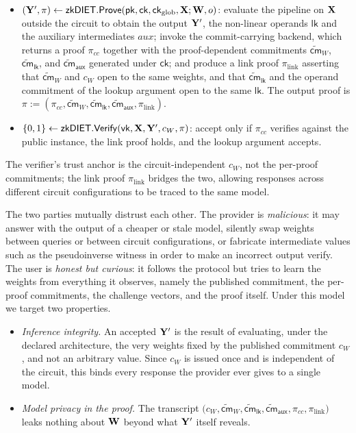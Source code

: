 \documentclass[runningheads]{llncs}
\begin{document}
\begin{itemize} [leftmargin=3mm, itemsep=2pt, topsep=2pt]
  \item $({\mathbf{Y}}', \pi) \leftarrow \mathsf{zkDIET}.\mathsf{Prove} (\mathsf{pk}, \mathsf{ck}, \mathsf{ck}_{\mathrm{glob}}, {\mathbf{X}}; {\mathbf{W}}, o)$:
        evaluate the pipeline on ${\mathbf{X}}$ outside the circuit to obtain the output ${\mathbf{Y}}'$, the non-linear operands $\mathsf{lk}$ and the auxiliary intermediates $\textit{aux}$; invoke the commit-carrying backend, which returns a proof $\pi_{cc}$ together with the proof-dependent commitments $\widetilde{\mathsf{cm}}_{W}$, $\widetilde{\mathsf{cm}}_{\mathsf{lk}}$, and $\widetilde{\mathsf{cm}}_{\mathsf{aux}}$ generated under $\mathsf{ck}$; and produce a link proof $\pi_{\mathrm{link}}$ asserting that $\widetilde{\mathsf{cm}}_{W}$ and $c_{W}$ open to the
        same weights, and that $\widetilde{\mathsf{cm}}_{\mathsf{lk}}$ and the operand commitment of the lookup argument open to the same $\mathsf{lk}$. The output
        proof is $\pi := (\pi_{cc}, \widetilde{\mathsf{cm}}_{W}, \widetilde{\mathsf{cm}}_{\mathsf{lk}}, \widetilde{\mathsf{cm}}_{\mathsf{aux}}, \pi_{\mathrm{link}})$.

  \item $\{0,1\} \leftarrow \mathsf{zkDIET}.\mathsf{Verify}(\mathsf{vk}, {\mathbf{X}}, {\mathbf{Y}}', c_{W}, \pi)$:
        accept only if $\pi_{cc}$ verifies against the public instance, the link proof holds, and the lookup argument accepts.
\end{itemize}

The verifier's trust anchor is the circuit-independent $c_{W}$, not the per-proof commitments; the link proof $\pi_{\mathrm{link}}$ bridges the two, allowing responses across different circuit configurations to be traced to the same model.

 The two parties mutually distrust each other. The provider is \emph{malicious}: it may answer with the output of a cheaper or stale model, silently swap weights between queries or between circuit configurations, or fabricate intermediate values such as the pseudoinverse witness in order to make an incorrect output verify. The user is \emph{honest but curious}: it follows the protocol but tries to learn the weights from everything it observes, namely the published commitment, the per-proof commitments, the challenge vectors, and the proof itself. Under this model we target two properties.

\begin{itemize} [leftmargin=3mm, itemsep=2pt, topsep=2pt]
    \item \emph{Inference integrity.} An accepted ${\mathbf{Y}}'$ is the result of evaluating, under the declared architecture, the very weights fixed by the published commitment $c_{W}$, and not an arbitrary value. Since $c_{W}$ is issued once and is independent of the circuit, this binds every response the provider ever gives to a single model.
    \item \emph{Model privacy in the proof.} The transcript $\bigl(c_{W}, \widetilde{\mathsf{cm}}_{W}, \widetilde{\mathsf{cm}}_{\mathsf{lk}}, \widetilde{\mathsf{cm}}_{\mathsf{aux}}, \pi_{cc}, \pi_{\mathrm{link}}\bigr)$ leaks nothing about ${\mathbf{W}}$ beyond what ${\mathbf{Y}}'$ itself reveals.
\end{itemize}
\end{document}
